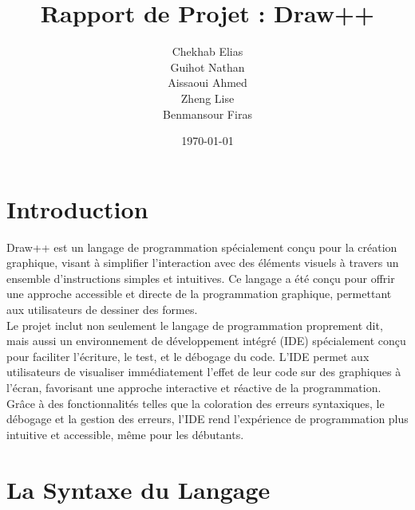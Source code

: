 \documentclass[12pt,a4paper]{report}
\title{Rapport de Projet : Draw++}
\author{
    Chekhab Elias \\
    Guihot Nathan \\
    Aissaoui Ahmed \\
    Zheng Lise \\
    Benmansour Firas
}
\date{\today}
\begin{document}
\maketitle
\tableofcontents

\chapter{Introduction}
Draw++ est un langage de programmation spécialement conçu pour la création graphique, visant à simplifier l'interaction avec des éléments visuels à travers un ensemble d'instructions simples et intuitives. Ce langage a été conçu pour offrir une approche accessible et directe de la programmation graphique, permettant aux utilisateurs de dessiner des formes.\\

Le projet inclut non seulement le langage de programmation proprement dit, mais aussi un environnement de développement intégré (IDE) spécialement conçu pour faciliter l'écriture, le test, et le débogage du code. L'IDE permet aux utilisateurs de visualiser immédiatement l'effet de leur code sur des graphiques à l'écran, favorisant une approche interactive et réactive de la programmation. Grâce à des fonctionnalités telles que la coloration des erreurs syntaxiques, le débogage et la gestion des erreurs, l'IDE rend l'expérience de programmation plus intuitive et accessible, même pour les débutants.

\chapter{La Syntaxe du Langage}
\end{document}
